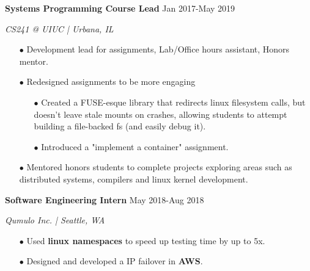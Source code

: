 \documentclass[paper=a4,fontsize=11pt]{scrartcl} %
\newcommand{\EducationEntry}[4]{
		\noindent \textbf{#1}     %
			\hfill#2 \par  %
		\noindent \textit{#3} \par        %
		\noindent\hangafter=0 \small #4 %
		\normalsize \par}
\begin{document}
\begin{minipage}[t]{0.75\textwidth}
\EducationEntry{Systems Programming Course Lead}{Jan 2017-May 2019}{CS241 @ UIUC | Urbana, IL}{
\begin{itemize}
  \item[$\bullet$] Development lead for assignments, Lab/Office hours assistant, Honors mentor.
  \item[$\bullet$] Redesigned assignments to be more engaging
    \begin{itemize}
        \item[$\bullet$] Created a FUSE-esque library that redirects linux filesystem calls, but doesn't leave stale mounts on crashes, allowing students to attempt building a file-backed fs (and easily debug it).
      \item[$\bullet$] Introduced a "implement a container" assignment.
    \end{itemize}
  \item[$\bullet$] Mentored honors students to complete projects exploring areas such as distributed systems, compilers and linux kernel development.
\end{itemize}
}

\EducationEntry{Software Engineering Intern}{May 2018-Aug 2018}{Qumulo Inc. | Seattle, WA}{
\begin{itemize}
  \item[$\bullet$] Used \textbf{linux namespaces} to speed up testing time by up to 5x.
  \item[$\bullet$] Designed and developed a IP failover in \textbf{AWS}.
\end{itemize}
}



\end{minipage}
\end{document}
